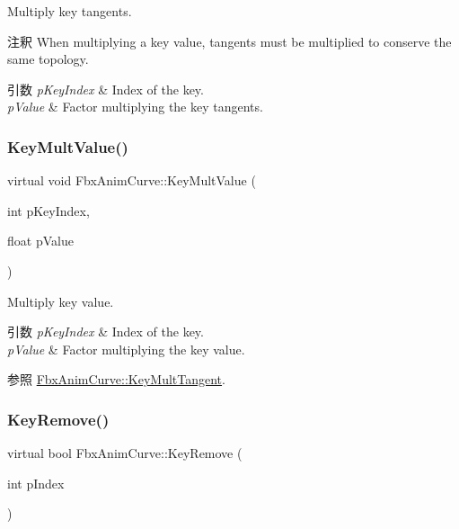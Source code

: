 Multiply key tangents. \begin{DoxyRemark}{注釈}
When multiplying a key value, tangents must be multiplied to conserve the same topology. 
\end{DoxyRemark}

\begin{DoxyParams}{引数}
{\em p\+Key\+Index} & Index of the key. \\
\hline
{\em p\+Value} & Factor multiplying the key tangents. \\
\hline
\end{DoxyParams}
\mbox{\label{class_fbx_anim_curve_a73262cd3affc5c9d098fda9a35a37779}} 
\subsubsection{\texorpdfstring{Key\+Mult\+Value()}{KeyMultValue()}}
{\footnotesize\ttfamily virtual void Fbx\+Anim\+Curve\+::\+Key\+Mult\+Value (\begin{DoxyParamCaption}\item[{int}]{p\+Key\+Index,  }\item[{float}]{p\+Value }\end{DoxyParamCaption})\hspace{0.3cm}{\ttfamily [pure virtual]}}

Multiply key value. 
\begin{DoxyParams}{引数}
{\em p\+Key\+Index} & Index of the key. \\
\hline
{\em p\+Value} & Factor multiplying the key value. \\
\hline
\end{DoxyParams}
\begin{DoxySeeAlso}{参照}
\hyperlink{class_fbx_anim_curve_a743514eebf5845d6bc13145e082a8ae5}{Fbx\+Anim\+Curve\+::\+Key\+Mult\+Tangent}. 
\end{DoxySeeAlso}
\mbox{\label{class_fbx_anim_curve_a083206eda111aa4c6803410427a4645c}} 
\subsubsection{\texorpdfstring{Key\+Remove()}{KeyRemove()}\hspace{0.1cm}{\footnotesize\ttfamily [1/2]}}
{\footnotesize\ttfamily virtual bool Fbx\+Anim\+Curve\+::\+Key\+Remove (\begin{DoxyParamCaption}\item[{int}]{p\+Index }\end{DoxyParamCaption})\hspace{0.3cm}{\ttfamily [pure virtual]}}

